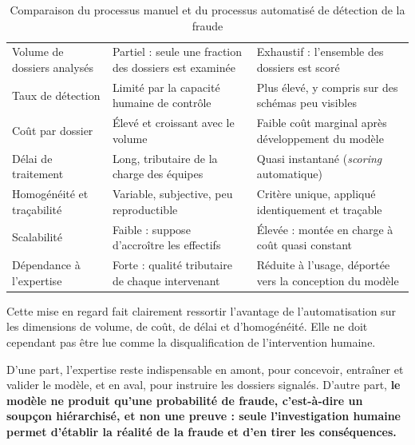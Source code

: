 \begin{table}[H]
    \centering
    \renewcommand{\arraystretch}{1.4}
    \renewcommand\tabularxcolumn[1]{m{#1}}
    \begin{tabularx}{\textwidth}{|>{\centering\arraybackslash}m{3.2cm}|>{\centering\arraybackslash}X|>{\centering\arraybackslash}X|}
        \hline
        \rowcolor{accenture}
        \multicolumn{1}{|c|}{\textcolor{white}{\textbf{Critère}}} & \multicolumn{1}{c|}{\textcolor{white}{\textbf{Processus manuel}}} & \multicolumn{1}{c|}{\textcolor{white}{\textbf{Processus automatisé (IA)}}} \\
        \hline
        Volume de dossiers analysés & Partiel : seule une fraction des dossiers est examinée & Exhaustif : l'ensemble des dossiers est scoré \\
        \hline
        Taux de détection & Limité par la capacité humaine de contrôle & Plus élevé, y compris sur des schémas peu visibles \\
        \hline
        Coût par dossier & Élevé et croissant avec le volume & Faible coût marginal après développement du modèle \\
        \hline
        Délai de traitement & Long, tributaire de la charge des équipes & Quasi instantané (\textit{scoring} automatique) \\
        \hline
        Homogénéité et traçabilité & Variable, subjective, peu reproductible & Critère unique, appliqué identiquement et traçable \\
        \hline
        Scalabilité & Faible : suppose d'accroître les effectifs & Élevée : montée en charge à coût quasi constant \\
        \hline
        Dépendance à l'expertise & Forte : qualité tributaire de chaque intervenant & Réduite à l'usage, déportée vers la conception du modèle \\
        \hline
    \end{tabularx}
    \caption{Comparaison du processus manuel et du processus automatisé de détection de la fraude}
    \label{tab:comparaison-processus}
\end{table}

Cette mise en regard fait clairement ressortir l'avantage de l'automatisation sur les dimensions de volume, de coût, de délai et d'homogénéité. Elle ne doit cependant pas être lue comme la disqualification de l'intervention humaine.

D'une part, l'expertise reste indispensable en amont, pour concevoir, entraîner et valider le modèle, et en aval, pour instruire les dossiers signalés. D'autre part, \textbf{le modèle ne produit qu'une probabilité de fraude, c'est-à-dire un soupçon hiérarchisé, et non une preuve : seule l'investigation humaine permet d'établir la réalité de la fraude et d'en tirer les conséquences.}

